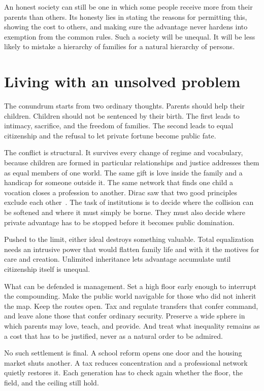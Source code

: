\documentclass[12pt,a4paper]{book}
\begin{document}
An honest society can still be one in which some people receive more from their parents than others. Its honesty lies in stating the reasons for permitting this, showing the cost to others, and making sure the advantage never hardens into exemption from the common rules. Such a society will be unequal. It will be less likely to mistake a hierarchy of families for a natural hierarchy of persons.

\section{Living with an unsolved problem}

The conundrum starts from two ordinary thoughts. Parents should help their children. Children should not be sentenced by their birth. The first leads to intimacy, sacrifice, and the freedom of families. The second leads to equal citizenship and the refusal to let private fortune become public fate.

The conflict is structural. It survives every change of regime and vocabulary, because children are formed in particular relationships and justice addresses them as equal members of one world. The same gift is love inside the family and a handicap for someone outside it. The same network that finds one child a vocation closes a profession to another. Dirac saw that two good principles exclude each other~\cite{dirac-81}. The task of institutions is to decide where the collision can be softened and where it must simply be borne. They must also decide where private advantage has to be stopped before it becomes public domination.

Pushed to the limit, either ideal destroys something valuable. Total equalization needs an intrusive power that would flatten family life and with it the motives for care and creation. Unlimited inheritance lets advantage accumulate until citizenship itself is unequal.

What can be defended is management. Set a high floor early enough to interrupt the compounding. Make the public world navigable for those who did not inherit the map. Keep the routes open. Tax and regulate transfers that confer command, and leave alone those that confer ordinary security. Preserve a wide sphere in which parents may love, teach, and provide. And treat what inequality remains as a cost that has to be justified, never as a natural order to be admired.

No such settlement is final. A school reform opens one door and the housing market shuts another. A tax reduces concentration and a professional network quietly restores it. Each generation has to check again whether the floor, the field, and the ceiling still hold.
\end{document}
